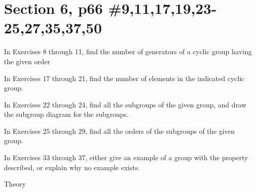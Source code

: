 \documentclass{article}
\newcommand{\assignment}{Section 6, p66 \#9,11,17,19,23-25,27,35,37,50}
\begin{document}
\section*{\assignment}

In Exercises 8 through 11, find the number of generators of a cyclic group having the given order
\begin{enumerate}
\end{enumerate}
In Exercises 17 through 21, find the number of elements in the indicated cyclic group.
\begin{enumerate}
\end{enumerate}
In Exercises 22 through 24, find all the subgroups of the given group, and draw the subgroup diagram for the subgroups.
\begin{enumerate}
\end{enumerate}
In Exercises 25 through 29, find all the orders of the subgroups of the given group.
\begin{enumerate}
\end{enumerate}
In Exercises 33 through 37, either give an example of a group with the property described, or explain why no example exists.
\begin{enumerate}
\end{enumerate}
Theory
\begin{enumerate}
\end{enumerate}
\end{document}

